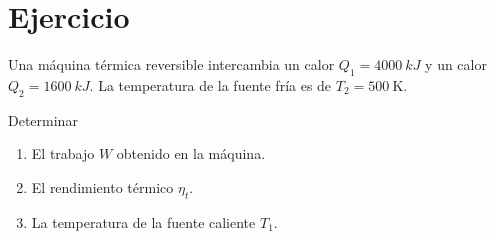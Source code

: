 \section{Ejercicio}\label{ej:Chap07Ejercicio07}
Una máquina térmica reversible intercambia un calor $Q_1=\SI{4000}{kJ}$ y un calor $Q_2=\SI{1600}{kJ}$. La temperatura de la fuente fría es de $T_2=\SI{500}{\kelvin}$.

Determinar
\begin{enumerate}
    \item El trabajo $W$ obtenido en la máquina.
    \item El rendimiento térmico $\eta_t$.
    \item La temperatura de la fuente caliente $T_1$.
\end{enumerate}

